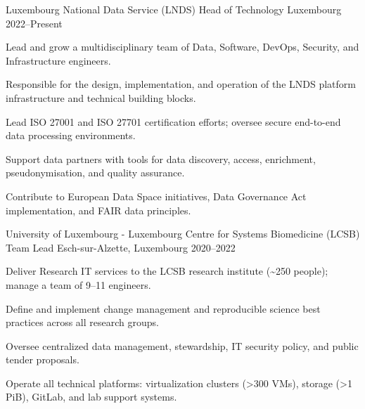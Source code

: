 

\begin{cventries}

  \cventry
    {Luxembourg National Data Service (LNDS)} %
    {Head of Technology} %
    {Luxembourg} %
    {2022--Present} %
    {
      \begin{cvitems} %
        \item {Lead and grow a multidisciplinary team of Data, Software, DevOps, Security, and Infrastructure engineers.}
        \item {Responsible for the design, implementation, and operation of the LNDS platform infrastructure and technical building blocks.}
        \item {Lead ISO 27001 and ISO 27701 certification efforts; oversee secure end-to-end data processing environments.}
        \item {Support data partners with tools for data discovery, access, enrichment, pseudonymisation, and quality assurance.}
        \item {Contribute to European Data Space initiatives, Data Governance Act implementation, and FAIR data principles.}
      \end{cvitems}
    }

  \cventry
    {University of Luxembourg - Luxembourg Centre for Systems Biomedicine (LCSB)} %
    {Team Lead} %
    {Esch-sur-Alzette, Luxembourg} %
    {2020--2022} %
    {
      \begin{cvitems} %
        \item {Deliver Research IT services to the LCSB research institute (\textasciitilde 250 people); manage a team of 9--11 engineers.}
        \item {Define and implement change management and reproducible science best practices across all research groups.}
        \item {Oversee centralized data management, stewardship, IT security policy, and public tender proposals.}
        \item {Operate all technical platforms: virtualization clusters (\textgreater 300 VMs), storage (\textgreater 1 PiB), GitLab, and lab support systems.}
      \end{cvitems}
    }


\end{cventries}
